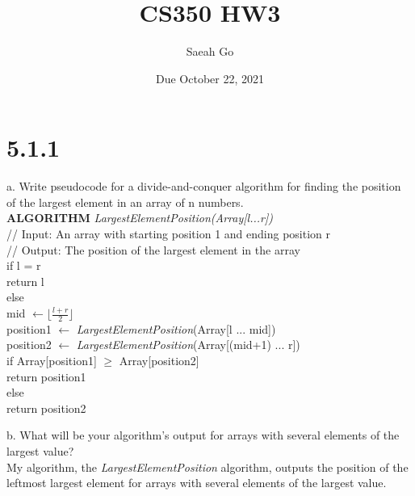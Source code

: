 \documentclass[8pt, letterpaper]{article}
\title{CS350 HW3}
\author{Saeah Go}
\date{Due October 22, 2021}
\begin{document}
\maketitle

\section{5.1.1}
a. Write pseudocode for a divide-and-conquer algorithm for finding the position of the largest element in an array of n numbers. \\
\textbf{ALGORITHM} \textit{LargestElementPosition(Array[l...r])} \\
\indent // Input: An array with starting position 1 and ending position r \\
\indent // Output: The position of the largest element in the array \\
\indent if l = r \\
\indent \indent return l \\
\indent else \\
\indent \indent mid $\leftarrow \lfloor\frac{l+r}{2}\rfloor$ \\
\indent \indent position1 $\leftarrow$ \textit{LargestElementPosition}(Array[l ... mid]) \\
\indent \indent position2 $\leftarrow$ \textit{LargestElementPosition}(Array[(mid+1) ... r]) \\
\indent \indent if Array[position1] $\ge$ Array[position2] \\
\indent \indent \indent return position1 \\
\indent \indent else \\
\indent \indent \indent return position2 

b. What will be your algorithm’s output for arrays with several elements of
the largest value? \\
My algorithm, the \textit{LargestElementPosition} algorithm, outputs the position of the leftmost largest element for arrays with several elements of the largest value. 
\end{document}
